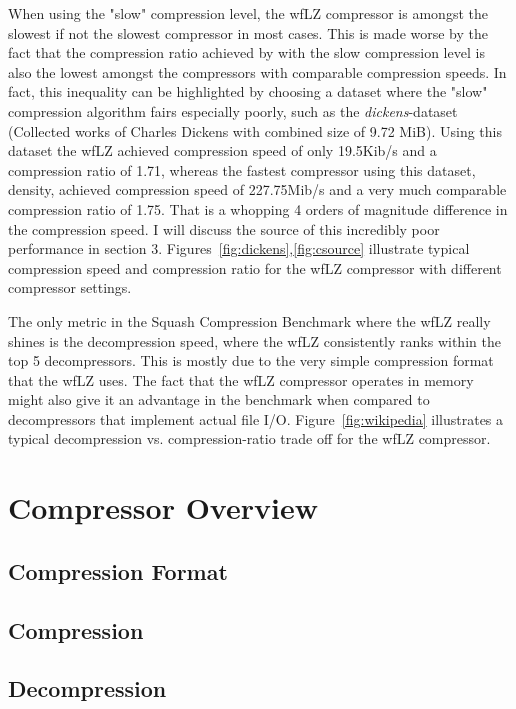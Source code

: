 \documentclass[english]{tktltiki2}
\theoremstyle{definition}
\theoremstyle{remark}
\begin{document}
When using the "slow" compression level, the wfLZ compressor is amongst the slowest if not the slowest compressor in most cases. This is made worse by the fact that the compression ratio achieved by with the slow compression level is also the lowest amongst the compressors with comparable compression speeds. In fact, this inequality can be highlighted by choosing a dataset where the "slow" compression algorithm fairs especially poorly, such as the \textit{dickens}-dataset (Collected works of Charles Dickens with combined size of 9.72 MiB). Using this dataset the wfLZ achieved compression speed of only 19.5Kib/s and a compression ratio of 1.71, whereas the fastest compressor using this dataset, density, achieved compression speed of 227.75Mib/s and a very much comparable compression ratio of 1.75. That is a whopping 4 orders of magnitude difference in the compression speed. I will discuss the source of this incredibly poor performance in section 3. Figures~\ref{fig:dickens},\ref{fig:csource} illustrate typical compression speed and compression ratio for the wfLZ compressor with different compressor settings.      

The only metric in the Squash Compression Benchmark where the wfLZ really shines is the decompression speed, where the wfLZ consistently ranks within the top 5 decompressors. This is mostly due to the very simple compression format that the wfLZ uses. The fact that the wfLZ compressor operates in memory might also give it an advantage in the benchmark when compared to decompressors that implement actual file I/O. Figure~\ref{fig:wikipedia} illustrates a typical decompression vs. compression-ratio trade off for the wfLZ compressor.


\section{Compressor Overview}

\subsection{Compression Format}

\subsection{Compression}

\subsection{Decompression}
\end{document}

